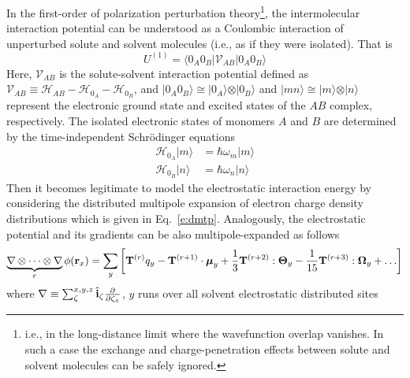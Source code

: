 \documentclass[a4paper,titlepage,twoside,fleqn,12pt]{book}
\newcommand{\BM}[1]{\ensuremath{\mbox{\boldmath${#1}$}}}
\begin{document}
\begin{refsection}
In the first\hyp{}order of polarization perturbation
theory\footnote{i.e., in the long\hyp{}distance limit 
where the wavefunction overlap vanishes. In such a case the
exchange and charge\hyp{}penetration effects 
between solute and solvent molecules can be safely ignored.}, 
the intermolecular interaction potential
can be understood as a Coulombic interaction
of unperturbed solute and solvent molecules (i.e., 
as if they were isolated).\citep{Jeziorski.Moszynski.Szalewicz.ChemRev.1994,Stone.TheTheoryOfIntermolecularForces.1996}
That is
%
\begin{equation} \label{e:eint-1}
U^{(1)} = 
\langle 0_A0_B \lvert \mathscr{V}_{AB} \rvert 0_A0_B \rangle 
\end{equation}
%
Here, $\mathscr{V}_{AB}$ is the solute\hyp{}solvent
interaction potential defined as $\mathscr{V}_{AB}\equiv\mathscr{H}_{AB} - \mathscr{H}_{0_A} - \mathscr{H}_{0_B} $,
and $\vert 0_A0_B \rangle \cong \vert 0_A \rangle \otimes \vert 0_B \rangle$
and $\vert mn \rangle \cong \vert m \rangle \otimes \vert n \rangle$
represent the electronic ground state and excited states
of the $AB$ complex, respectively. The isolated electronic states of monomers $A$
and $B$ are determined by the time\hyp{}independent Schr{\"o}dinger
equations
%
\begin{subequations}
 \begin{align}
  \mathscr{H}_{0_A} \vert m \rangle &= \hbar \omega_m \vert m \rangle \\
  \mathscr{H}_{0_B} \vert n \rangle &= \hbar \omega_n \vert n \rangle
 \end{align}
\end{subequations}
%
Then it becomes legitimate to model the electrostatic interaction
energy by considering the distributed multipole expansion of electron
charge density distributions\citep{Stone.TheTheoryOfIntermolecularForces.1996}
which is given in Eq.~\eqref{e:dmtp}. Analogously,
the electrostatic potential and its gradients
can be also multipole\hyp{}expanded as follows
%
\begin{equation} \label{e:potential-gradients}
\underbrace{\nabla \otimes \cdots \otimes \nabla}_{r} \phi({\bf r}_x) = 
\sum_y \left[ 
{\bf T}^{(r)} q_y - {\bf T}^{(r+1)} \cdot {\BM \mu}_y + 
 \frac{1}{3} {\bf T}^{(r+2)} : {\BM \Theta}_y - 
\frac{1}{15} {\bf T}^{(r+3)} : {\BM \Omega}_y + \ldots
\right]
\end{equation}
%
where 
$\nabla \equiv \sum_{\zeta}^{x,y,z} \hat{\bf i}_\zeta \frac{\partial}{\partial \zeta_x}$, 
$y$ runs over all solvent electrostatic distributed sites

\end{refsection}
\end{document}
